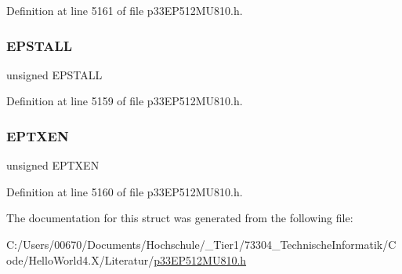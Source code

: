 Definition at line 5161 of file p33\+E\+P512\+M\+U810.\+h.

\mbox{\label{structtag_u1_e_p8_b_i_t_s_a47042104f04ebe06a23f9789bd400d7e}} 
\subsubsection{\texorpdfstring{E\+P\+S\+T\+A\+LL}{EPSTALL}}
{\footnotesize\ttfamily unsigned E\+P\+S\+T\+A\+LL}



Definition at line 5159 of file p33\+E\+P512\+M\+U810.\+h.

\mbox{\label{structtag_u1_e_p8_b_i_t_s_aa2d88c1be513e759c136823c86a355b4}} 
\subsubsection{\texorpdfstring{E\+P\+T\+X\+EN}{EPTXEN}}
{\footnotesize\ttfamily unsigned E\+P\+T\+X\+EN}



Definition at line 5160 of file p33\+E\+P512\+M\+U810.\+h.



The documentation for this struct was generated from the following file\+:\begin{DoxyCompactItemize}
\item 
C\+:/\+Users/00670/\+Documents/\+Hochschule/\+\_\+\+Tier1/73304\+\_\+\+Technische\+Informatik/\+Code/\+Hello\+World4.\+X/\+Literatur/\hyperlink{p33_e_p512_m_u810_8h}{p33\+E\+P512\+M\+U810.\+h}\end{DoxyCompactItemize}
